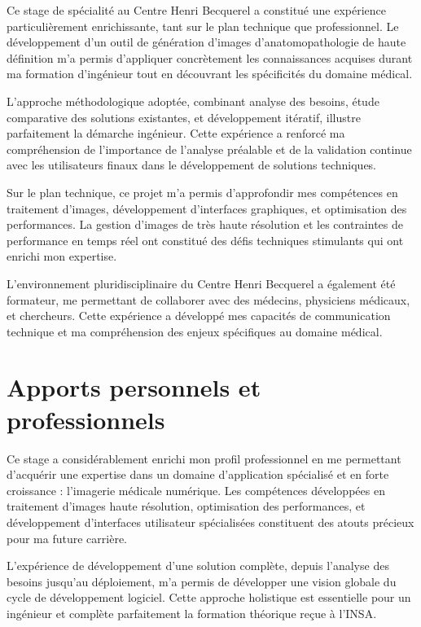\documentclass[12pt,a4paper]{report}
\begin{document}
\begin{}
\begin{}
\begin{}
Ce stage de spécialité au Centre Henri Becquerel a constitué une expérience particulièrement enrichissante, tant sur le plan technique que professionnel. Le développement d'un outil de génération d'images d'anatomopathologie de haute définition m'a permis d'appliquer concrètement les connaissances acquises durant ma formation d'ingénieur tout en découvrant les spécificités du domaine médical.

L'approche méthodologique adoptée, combinant analyse des besoins, étude comparative des solutions existantes, et développement itératif, illustre parfaitement la démarche ingénieur. Cette expérience a renforcé ma compréhension de l'importance de l'analyse préalable et de la validation continue avec les utilisateurs finaux dans le développement de solutions techniques.

Sur le plan technique, ce projet m'a permis d'approfondir mes compétences en traitement d'images, développement d'interfaces graphiques, et optimisation des performances. La gestion d'images de très haute résolution et les contraintes de performance en temps réel ont constitué des défis techniques stimulants qui ont enrichi mon expertise.

L'environnement pluridisciplinaire du Centre Henri Becquerel a également été formateur, me permettant de collaborer avec des médecins, physiciens médicaux, et chercheurs. Cette expérience a développé mes capacités de communication technique et ma compréhension des enjeux spécifiques au domaine médical.

\section{Apports personnels et professionnels}

Ce stage a considérablement enrichi mon profil professionnel en me permettant d'acquérir une expertise dans un domaine d'application spécialisé et en forte croissance : l'imagerie médicale numérique. Les compétences développées en traitement d'images haute résolution, optimisation des performances, et développement d'interfaces utilisateur spécialisées constituent des atouts précieux pour ma future carrière.

L'expérience de développement d'une solution complète, depuis l'analyse des besoins jusqu'au déploiement, m'a permis de développer une vision globale du cycle de développement logiciel. Cette approche holistique est essentielle pour un ingénieur et complète parfaitement la formation théorique reçue à l'INSA.


\end{}
\end{}
\end{}
\end{document}
